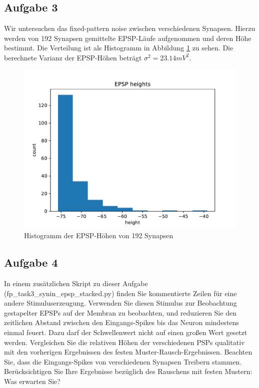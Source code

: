 \documentclass[10pt,a4paper]{scrartcl}
\begin{document}
\subsection{Aufgabe 3}
Wir untersuchen das fixed-pattern noise zwischen verschiedenen Synapsen. Hierzu werden von 192 Synapsen gemittelte EPSP-Läufe aufgenommen und deren Höhe bestimmt. Die Verteilung ist als Histogramm in Abbildung \ref{fig:abb10} zu sehen. Die berechnete Varianz der EPSP-Höhen beträgt $\sigma^2= 23.14mV^2$.

\begin{figure} [ht]
\begin{center}
\label{fig:abb10}
\caption{Histogramm der EPSP-Höhen von 192 Synapsen}
\includegraphics[scale=0.35]{pictures/epsp_heights.pdf} 
\end{center}
\end{figure}



\subsection{Aufgabe 4}
In einem zusätzlichen Skript zu dieser Aufgabe (fp_task3_synin_epsp_stacked.py) finden Sie
kommentierte Zeilen für eine andere Stimuluserzeugung. Verwenden Sie diesen Stimulus zur Beobachtung gestapelter
EPSPs auf der Membran zu beobachten, und reduzieren Sie den zeitlichen Abstand zwischen den Eingangs-Spikes
bis das Neuron mindestens einmal feuert. Dazu darf der Schwellenwert nicht auf einen großen
Wert gesetzt werden.
Vergleichen Sie die relativen Höhen der verschiedenen PSPs qualitativ mit den vorherigen Ergebnissen des festen
Muster-Rausch-Ergebnissen. Beachten Sie, dass die Eingangs-Spikes von verschiedenen Synapsen
Treibern stammen. Berücksichtigen Sie Ihre Ergebnisse bezüglich des Rauschens mit festen Mustern: Was erwarten Sie?
\end{document}
